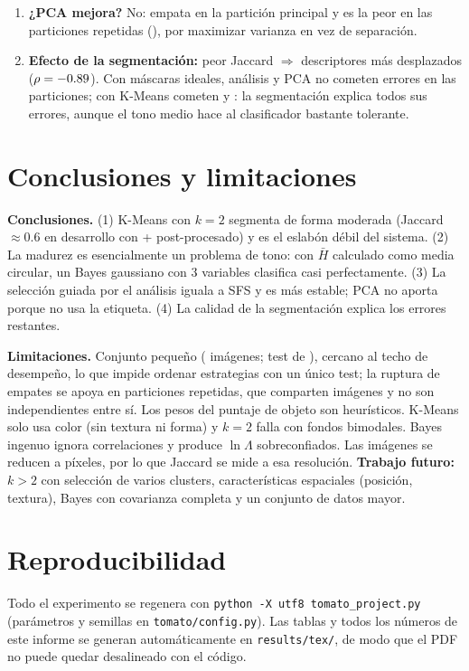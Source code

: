 \documentclass[11pt,a4paper]{article}
\begin{document}
\begin{enumerate}[leftmargin=1.6em,itemsep=2pt]
(\PCAcum\,\%), coincidente con el codo y con Kaiser ($\lambda_4\ll1$).
\item \textbf{¿PCA mejora?} No: empata en la partición principal y es la peor en las
particiones repetidas (\PcaRepKmAcc), por maximizar varianza en vez de separación.
\item \textbf{Efecto de la segmentación:} peor Jaccard $\Rightarrow$ descriptores más desplazados
($\rho=-0.89$). Con máscaras ideales, análisis y PCA no cometen errores en las
\NRepeats{} particiones; con K-Means cometen \AnRepKmErr{} y \PcaRepKmErr: la segmentación
explica todos sus errores, aunque el tono medio hace al clasificador bastante tolerante.
\end{enumerate}

\section{Conclusiones y limitaciones}

\textbf{Conclusiones.} (1) K-Means con $k=2$ segmenta de forma moderada
(Jaccard $\approx0.6$ en desarrollo con \BestCombo{} + post-procesado) y es el eslabón débil
del sistema. (2) La madurez es esencialmente un problema de tono: con $\bar H$ calculado como
media circular, un Bayes gaussiano con 3 variables clasifica casi perfectamente. (3) La
selección guiada por el análisis iguala a SFS y es más estable; PCA no aporta porque no usa
la etiqueta. (4) La calidad de la segmentación explica los errores restantes.

\textbf{Limitaciones.} Conjunto pequeño (\NImages{} imágenes; test de \NTest), cercano al techo
de desempeño, lo que impide ordenar estrategias con un único test; la ruptura de empates se
apoya en particiones repetidas, que comparten imágenes y no son independientes entre sí. Los
pesos del puntaje de objeto son heurísticos. K-Means solo usa color (sin textura ni forma) y
$k=2$ falla con fondos bimodales. Bayes ingenuo ignora correlaciones y produce $\ln\Lambda$
sobreconfiados. Las imágenes se reducen a \MaxSide{} píxeles, por lo que Jaccard se mide a esa
resolución. \textbf{Trabajo futuro:} $k>2$ con selección de varios clusters, características
espaciales (posición, textura), Bayes con covarianza completa y un conjunto de datos mayor.

\section*{Reproducibilidad}

Todo el experimento se regenera con \texttt{python -X utf8 tomato\_project.py}
(parámetros y semillas en \texttt{tomato/config.py}). Las tablas y todos los números de
este informe se generan automáticamente en \texttt{results/tex/}, de modo que el PDF no
puede quedar desalineado con el código.
\end{document}
